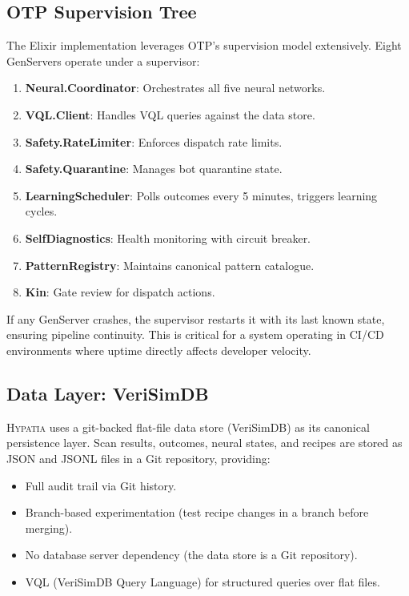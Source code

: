 \documentclass[11pt,a4paper]{article}
\begin{document}
\subsection{OTP Supervision Tree}

The Elixir implementation leverages OTP's supervision model extensively. Eight GenServers operate under a supervisor:

\begin{enumerate}[nosep]
  \item \textbf{Neural.Coordinator}: Orchestrates all five neural networks.
  \item \textbf{VQL.Client}: Handles VQL queries against the data store.
  \item \textbf{Safety.RateLimiter}: Enforces dispatch rate limits.
  \item \textbf{Safety.Quarantine}: Manages bot quarantine state.
  \item \textbf{LearningScheduler}: Polls outcomes every 5 minutes, triggers learning cycles.
  \item \textbf{SelfDiagnostics}: Health monitoring with circuit breaker.
  \item \textbf{PatternRegistry}: Maintains canonical pattern catalogue.
  \item \textbf{Kin}: Gate review for dispatch actions.
\end{enumerate}

If any GenServer crashes, the supervisor restarts it with its last known state, ensuring pipeline continuity. This is critical for a system operating in CI/CD environments where uptime directly affects developer velocity.

\subsection{Data Layer: VeriSimDB}

\textsc{Hypatia} uses a git-backed flat-file data store (VeriSimDB) as its canonical persistence layer. Scan results, outcomes, neural states, and recipes are stored as JSON and JSONL files in a Git repository, providing:

\begin{itemize}[nosep]
  \item Full audit trail via Git history.
  \item Branch-based experimentation (test recipe changes in a branch before merging).
  \item No database server dependency (the data store is a Git repository).
  \item VQL (VeriSimDB Query Language) for structured queries over flat files.
\end{itemize}
\end{document}
